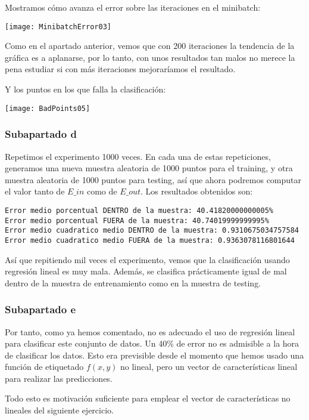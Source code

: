 \documentclass[11pt]{article}
\begin{document}
Mostramos cómo avanza el error sobre las iteraciones en el minibatch:

\texttt{[image: MinibatchError03]}

Como en el apartado anterior, vemos que con 200 iteraciones la tendencia de la gráfica es a aplanarse, por lo tanto, con unos resultados tan malos no merece la pena estudiar si con más iteraciones mejoraríamos el resultado.

Y los puntos en los que falla la clasificación:

\texttt{[image: BadPoints05]}

\subsubsection{Subapartado d}

Repetimos el experimento 1000 veces. En cada una de estas repeticiones, generamos una nueva muestra aleatoria de 1000 puntos para el training, y otra muestra aleatoria de 1000 puntos para testing, así que ahora podremos computar el valor tanto de $E\_in$ como de $E\_out$. Los resultados obtenidos son:

\begin{lstlisting}
Error medio porcentual DENTRO de la muestra: 40.41820000000005%
Error medio porcentual FUERA de la muestra: 40.74019999999995%
Error medio cuadratico medio DENTRO de la muestra: 0.9310675034757584
Error medio cuadratico medio FUERA de la muestra: 0.9363078116801644
\end{lstlisting}

Así que repitiendo mil veces el experimento, vemos que la clasificación usando regresión lineal es muy mala. Además, se clasifica prácticamente igual de mal dentro de la muestra de entrenamiento como en la muestra de testing.

\subsubsection{Subapartado e}

Por tanto, como ya hemos comentado, no es adecuado el uso de regresión lineal para clasificar este conjunto de datos. Un 40\% de error no es admisible a la hora de clasificar los datos. Esto era previsible desde el momento que hemos usado una función de etiquetado $f(x,y)$ no lineal, pero un vector de características lineal para realizar las predicciones.

Todo esto es motivación suficiente para emplear el vector de características no lineales del siguiente ejercicio.
\end{document}
